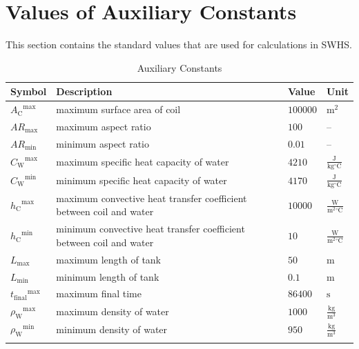 \documentclass[12pt]{article}
\begin{document}
\section{Values of Auxiliary Constants}
\label{Sec:AuxConstants}
This section contains the standard values that are used for calculations in SWHS.

\begin{longtabu}{l X[l] l l}
\toprule
\textbf{Symbol} & \textbf{Description} & \textbf{Value} & \textbf{Unit}
\\
\midrule
\endhead
${{A_{\text{C}}}^{\text{max}}}$ & maximum surface area of coil & $100000$ & ${\text{m}^{2}}$
\\
${\mathit{AR}_{\text{max}}}$ & maximum aspect ratio & $100$ & --
\\
${\mathit{AR}_{\text{min}}}$ & minimum aspect ratio & $0.01$ & --
\\
${{C_{\text{W}}}^{\text{max}}}$ & maximum specific heat capacity of water & $4210$ & $\frac{\text{J}}{\text{kg}{}^{\circ}\text{C}}$
\\
${{C_{\text{W}}}^{\text{min}}}$ & minimum specific heat capacity of water & $4170$ & $\frac{\text{J}}{\text{kg}{}^{\circ}\text{C}}$
\\
${{h_{\text{C}}}^{\text{max}}}$ & maximum convective heat transfer coefficient between coil and water & $10000$ & $\frac{\text{W}}{\text{m}^{2}{}^{\circ}\text{C}}$
\\
${{h_{\text{C}}}^{\text{min}}}$ & minimum convective heat transfer coefficient between coil and water & $10$ & $\frac{\text{W}}{\text{m}^{2}{}^{\circ}\text{C}}$
\\
${L_{\text{max}}}$ & maximum length of tank & $50$ & ${\text{m}}$
\\
${L_{\text{min}}}$ & minimum length of tank & $0.1$ & ${\text{m}}$
\\
${{t_{\text{final}}}^{\text{max}}}$ & maximum final time & $86400$ & ${\text{s}}$
\\
${{ρ_{\text{W}}}^{\text{max}}}$ & maximum density of water & $1000$ & $\frac{\text{kg}}{\text{m}^{3}}$
\\
${{ρ_{\text{W}}}^{\text{min}}}$ & minimum density of water & $950$ & $\frac{\text{kg}}{\text{m}^{3}}$
\\
\bottomrule
\caption{Auxiliary Constants}
\label{Table:TAuxConsts}
\end{longtabu}
\end{document}
